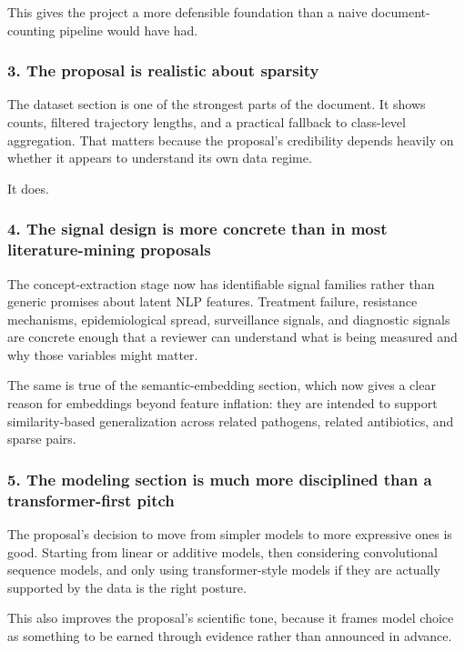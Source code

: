 This gives the project a more defensible foundation than a naive
document-counting pipeline would have had.

\subsubsection{3. The proposal is realistic about
sparsity}\label{the-proposal-is-realistic-about-sparsity}

The dataset section is one of the strongest parts of the document. It
shows counts, filtered trajectory lengths, and a practical fallback to
class-level aggregation. That matters because the proposal's credibility
depends heavily on whether it appears to understand its own data regime.

It does.

\subsubsection{4. The signal design is more concrete than in most
literature-mining
proposals}\label{the-signal-design-is-more-concrete-than-in-most-literature-mining-proposals}

The concept-extraction stage now has identifiable signal families rather
than generic promises about latent NLP features. Treatment failure,
resistance mechanisms, epidemiological spread, surveillance signals, and
diagnostic signals are concrete enough that a reviewer can understand
what is being measured and why those variables might matter.

The same is true of the semantic-embedding section, which now gives a
clear reason for embeddings beyond feature inflation: they are intended
to support similarity-based generalization across related pathogens,
related antibiotics, and sparse pairs.

\subsubsection{5. The modeling section is much more disciplined than a
transformer-first
pitch}\label{the-modeling-section-is-much-more-disciplined-than-a-transformer-first-pitch}

The proposal's decision to move from simpler models to more expressive
ones is good. Starting from linear or additive models, then considering
convolutional sequence models, and only using transformer-style models
if they are actually supported by the data is the right posture.

This also improves the proposal's scientific tone, because it frames
model choice as something to be earned through evidence rather than
announced in advance.

